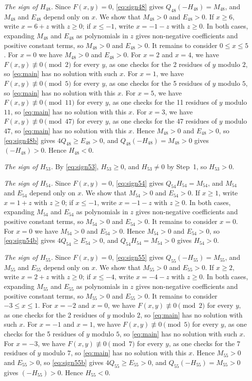 \documentclass[11pt]{article}
\begin{document}
\emph{The sign of $H_{48}$.} Since $F(x,y)=0$, \eqref{eq:sign48} gives $Q_{48}(-H_{48})=M_{48}$, and $M_{48}$ and $E_{48}$ depend only on $x$. We show that $M_{48}>0$ and $E_{48}>0$. If $x\geq6$, write $x=6+z$ with $z\geq0$; if $x\leq-1$, write $x=-1-z$ with $z\geq0$. In both cases, expanding $M_{48}$ and $E_{48}$ as polynomials in $z$ gives non-negative coefficients and positive constant terms, so $M_{48}>0$ and $E_{48}>0$. It remains to consider $0\leq x\leq5$. For $x=0$ we have $M_{48}>0$ and $E_{48}>0$. For $x=2$ and $x=4$, we have $F(x,y)\not\equiv0\pmod{2}$ for every $y$, as one checks for the 2 residues of $y$ modulo $2$, so \eqref{eq:main} has no solution with such $x$. For $x=1$, we have $F(x,y)\not\equiv0\pmod{5}$ for every $y$, as one checks for the 5 residues of $y$ modulo $5$, so \eqref{eq:main} has no solution with this $x$. For $x=5$, we have $F(x,y)\not\equiv0\pmod{11}$ for every $y$, as one checks for the 11 residues of $y$ modulo $11$, so \eqref{eq:main} has no solution with this $x$. For $x=3$, we have $F(x,y)\not\equiv0\pmod{47}$ for every $y$, as one checks for the 47 residues of $y$ modulo $47$, so \eqref{eq:main} has no solution with this $x$. Hence $M_{48}>0$ and $E_{48}>0$, so \eqref{eq:sign48b} gives $4Q_{48}\geq E_{48}>0$, and $Q_{48}(-H_{48})=M_{48}>0$ gives $(-H_{48})>0$. Hence $H_{48}<0$.

\emph{The sign of $H_{53}$.} By \eqref{eq:sign53}, $H_{53}\geq0$, and $H_{53}\neq0$ by Step~1, so $H_{53}>0$.

\emph{The sign of $H_{54}$.} Since $F(x,y)=0$, \eqref{eq:sign54} gives $Q_{54}H_{54}=M_{54}$, and $M_{54}$ and $E_{54}$ depend only on $x$. We show that $M_{54}>0$ and $E_{54}>0$. If $x\geq1$, write $x=1+z$ with $z\geq0$; if $x\leq-1$, write $x=-1-z$ with $z\geq0$. In both cases, expanding $M_{54}$ and $E_{54}$ as polynomials in $z$ gives non-negative coefficients and positive constant terms, so $M_{54}>0$ and $E_{54}>0$. It remains to consider $x=0$. For $x=0$ we have $M_{54}>0$ and $E_{54}>0$. Hence $M_{54}>0$ and $E_{54}>0$, so \eqref{eq:sign54b} gives $4Q_{54}\geq E_{54}>0$, and $Q_{54}H_{54}=M_{54}>0$ gives $H_{54}>0$.

\emph{The sign of $H_{55}$.} Since $F(x,y)=0$, \eqref{eq:sign55} gives $Q_{55}(-H_{55})=M_{55}$, and $M_{55}$ and $E_{55}$ depend only on $x$. We show that $M_{55}>0$ and $E_{55}>0$. If $x\geq2$, write $x=2+z$ with $z\geq0$; if $x\leq-4$, write $x=-4-z$ with $z\geq0$. In both cases, expanding $M_{55}$ and $E_{55}$ as polynomials in $z$ gives non-negative coefficients and positive constant terms, so $M_{55}>0$ and $E_{55}>0$. It remains to consider $-3\leq x\leq1$. For $x=-2$ and $x=0$, we have $F(x,y)\not\equiv0\pmod{2}$ for every $y$, as one checks for the 2 residues of $y$ modulo $2$, so \eqref{eq:main} has no solution with such $x$. For $x=-1$ and $x=1$, we have $F(x,y)\not\equiv0\pmod{5}$ for every $y$, as one checks for the 5 residues of $y$ modulo $5$, so \eqref{eq:main} has no solution with such $x$. For $x=-3$, we have $F(x,y)\not\equiv0\pmod{7}$ for every $y$, as one checks for the 7 residues of $y$ modulo $7$, so \eqref{eq:main} has no solution with this $x$. Hence $M_{55}>0$ and $E_{55}>0$, so \eqref{eq:sign55b} gives $4Q_{55}\geq E_{55}>0$, and $Q_{55}(-H_{55})=M_{55}>0$ gives $(-H_{55})>0$. Hence $H_{55}<0$.
\end{document}
